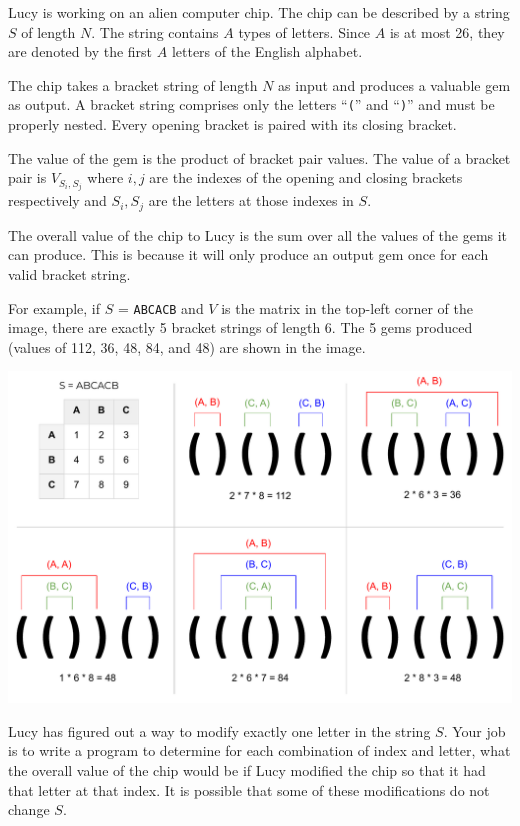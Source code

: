 
Lucy is working on an alien computer chip. The chip can be described by a string $S$ of length $N$. The string contains $A$ types of letters. Since $A$ is at most 26, they are denoted by the first $A$ letters of the English alphabet.

The chip takes a bracket string of length $N$ as input and produces a valuable gem as output. A bracket string comprises only the letters ``\texttt{(}'' and ``\texttt{)}'' and must be properly nested. Every opening bracket is paired with its closing bracket.

The value of the gem is the product of bracket pair values. The value of a bracket pair is $V_{S_i, S_j}$ where $i,j$ are the indexes of the opening and closing brackets respectively and $S_i, S_j$ are the letters at those indexes in $S$.

The overall value of the chip to Lucy is the sum over all the values of the gems it can produce. This is because it will only produce an output gem once for each valid bracket string.

For example, if $S$ = \texttt{ABCACB} and $V$ is the matrix in the top-left corner of the image, there are exactly 5 bracket strings of length 6. The 5 gems produced (values of 112, 36, 48, 84, and 48) are shown in the image.

\begin{center}
 \includegraphics[width=\textwidth]{Brackets}
\end{center}

Lucy has figured out a way to modify exactly one letter in the string $S$. Your job is to write a program to determine for each combination of index and letter, what the overall value of the chip would be if Lucy modified the chip so that it had that letter at that index. It is possible that some of these modifications do not change $S$.


